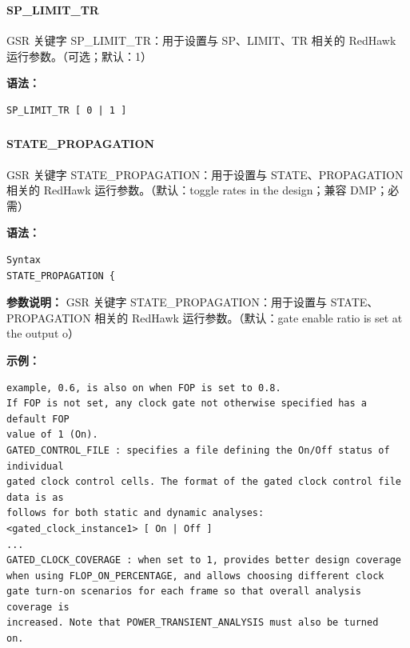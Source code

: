 \subsubsection{}
\paragraph*{SP_LIMIT_TR}

GSR 关键字 SP_LIMIT_TR：用于设置与 SP、LIMIT、TR 相关的 RedHawk 运行参数。（可选；默认：1）

\textbf{语法：}
\begin{lstlisting}
SP_LIMIT_TR [ 0 | 1 ]
\end{lstlisting}

\subsubsection{}
\paragraph*{STATE_PROPAGATION}

GSR 关键字 STATE_PROPAGATION：用于设置与 STATE、PROPAGATION 相关的 RedHawk 运行参数。（默认：toggle rates in the design；兼容 DMP；必需）

\textbf{语法：}
\begin{lstlisting}
Syntax
STATE_PROPAGATION {
\end{lstlisting}

\textbf{参数说明：}
GSR 关键字 STATE\_PROPAGATION：用于设置与 STATE、PROPAGATION 相关的 RedHawk 运行参数。（默认：gate enable ratio is set at the output o）

\textbf{示例：}
\begin{lstlisting}
example, 0.6, is also on when FOP is set to 0.8.
If FOP is not set, any clock gate not otherwise specified has a default FOP
value of 1 (On).
GATED_CONTROL_FILE : specifies a file defining the On/Off status of individual
gated clock control cells. The format of the gated clock control file data is as
follows for both static and dynamic analyses:
<gated_clock_instance1> [ On | Off ]
...
GATED_CLOCK_COVERAGE : when set to 1, provides better design coverage
when using FLOP_ON_PERCENTAGE, and allows choosing different clock
gate turn-on scenarios for each frame so that overall analysis coverage is
increased. Note that POWER_TRANSIENT_ANALYSIS must also be turned
on.
\end{lstlisting}

